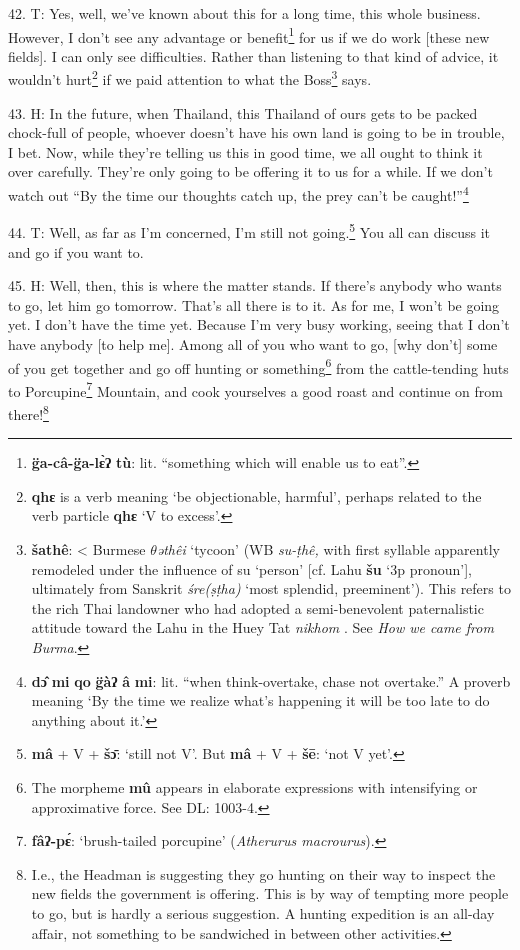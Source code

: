 42. T: Yes, well, we've known about this for a long time, this whole business.
However, I don't see any advantage or benefit\footnote{\textbf{g̈a-câ-g̈a-lɛ̀ʔ} \textbf{tù}: lit. ``something which will enable us to eat''.} for us if we do work [these new
fields]. I can only see difficulties. Rather than listening to that kind of advice,
it wouldn't hurt\footnote{\textbf{qhɛ} is a verb meaning `be objectionable, harmful', perhaps related to the verb particle \textbf{qhɛ} `V to excess'.} if we paid attention to what the Boss\footnote{\textbf{šathê}: < Burmese \textit{$\theta$əthêi } `tycoon' (WB \textit{su-ṭhê, }with first syllable apparently remodeled under the influence of su `person' [cf. Lahu \textbf{šu} `3p pronoun'], ultimately from Sanskrit \textit{śre(ṣṭha) } `most splendid, preeminent'). This refers to the rich Thai landowner who had adopted a semi-benevolent paternalistic attitude toward the Lahu in the Huey Tat \textit{nikhom }. See \textit{How we came from Burma}.} says.

43. H: In the future, when Thailand, this Thailand of ours gets to be packed chock-full
of people, whoever doesn't have his own land is going to be in trouble, I bet.
Now, while they're telling us this in good time, we all ought to think it over
carefully. They're only going to be offering it to us for a while. If we don't
watch out ``By the time our thoughts catch up, the prey can't be caught!''\footnote{\textbf{dɔ̂} \textbf{mi} \textbf{qo} \textbf{g̈àʔ} \textbf{â} \textbf{mi}: lit. ``when think-overtake, chase not overtake.'' A proverb meaning `By the time we realize what's happening it will be too late to do anything about it.'}

44. T: Well, as far as I'm concerned, I'm still not going.\footnote{\textbf{mâ} + V + \textbf{šɔ̄}: `still not V'. But \textbf{mâ} + V + \textbf{šē}: `not V yet'.} You all can
discuss it and go if you want to.

45. H: Well, then, this is where the matter stands. If there's anybody who wants
to go, let him go tomorrow. That's all there is to it. As for me, I won't be going
yet. I don't have the time yet. Because I'm very busy working, seeing that I don't
have anybody [to help me]. Among all of you who want to go, [why don't] some of
you get together and go off hunting or something\footnote{The morpheme \textbf{mû} appears in elaborate expressions with intensifying or approximative force. See DL: 1003-4.} from the cattle-tending huts
to Porcupine\footnote{\textbf{fâʔ-pɛ́}: `brush-tailed porcupine' (\textit{Atherurus macrourus}).} Mountain, and cook yourselves a good roast and continue on from
there!\footnote{I.e., the Headman is suggesting they go hunting on their way to inspect the new fields the government is offering. This is by way of tempting more people to go, but is hardly a serious suggestion. A hunting expedition is an all-day affair, not something to be sandwiched in between other activities.}

